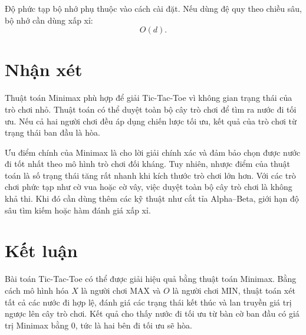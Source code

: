 \documentclass[12pt,a4paper]{article}
\begin{document}
Độ phức tạp bộ nhớ phụ thuộc vào cách cài đặt.
Nếu dùng đệ quy theo chiều sâu, bộ nhớ cần dùng xấp xỉ:
\[
O(d).
\]

\section{Nhận xét}

Thuật toán Minimax phù hợp để giải Tic-Tac-Toe vì không gian trạng thái của trò chơi nhỏ.
Thuật toán có thể duyệt toàn bộ cây trò chơi để tìm ra nước đi tối ưu.
Nếu cả hai người chơi đều áp dụng chiến lược tối ưu, kết quả của trò chơi từ trạng thái ban đầu là hòa.

Ưu điểm chính của Minimax là cho lời giải chính xác và đảm bảo chọn được nước đi tốt nhất theo mô hình trò chơi đối kháng.
Tuy nhiên, nhược điểm của thuật toán là số trạng thái tăng rất nhanh khi kích thước trò chơi lớn hơn.
Với các trò chơi phức tạp như cờ vua hoặc cờ vây, việc duyệt toàn bộ cây trò chơi là không khả thi.
Khi đó cần dùng thêm các kỹ thuật như cắt tỉa Alpha--Beta, giới hạn độ sâu tìm kiếm hoặc hàm đánh giá xấp xỉ.

\section{Kết luận}

Bài toán Tic-Tac-Toe có thể được giải hiệu quả bằng thuật toán Minimax.
Bằng cách mô hình hóa $X$ là người chơi MAX và $O$ là người chơi MIN, thuật toán xét tất cả các nước đi hợp lệ, đánh giá các trạng thái kết thúc và lan truyền giá trị ngược lên cây trò chơi.
Kết quả cho thấy nước đi tối ưu từ bàn cờ ban đầu có giá trị Minimax bằng $0$, tức là hai bên đi tối ưu sẽ hòa.
\end{document}
